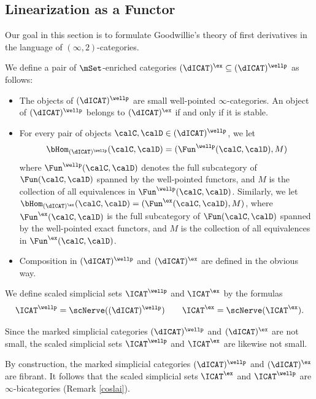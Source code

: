 \subsection{Linearization as a Functor}\label{finalx}\label{bisec5.3}

Our goal in this section is to formulate Goodwillie's theory of first derivatives in
the language of $(\infty,2)$-categories.

\begin{definition}
We define a pair of $\mSet$-enriched categories $(\dICAT)^{\ex} \subseteq
(\dICAT)^{\wellp}$ as follows:
\begin{itemize}
\item[$(1)$] The objects of $(\dICAT)^{\wellp}$ are small well-pointed $\infty$-categories.
An object of $(\dICAT)^{\wellp}$ belongs to $(\dICAT)^{\ex}$ if and only if it is stable.
\item[$(2)$] For every pair of objects $\calC, \calD \in (\dICAT)^{\wellp}$, we let
$$\bHom_{ (\dICAT)^{\wellp}}( \calC, \calD) = ( \Fun^{\wellp}(\calC, \calD), M)$$
where $\Fun^{\wellp}(\calC, \calD)$ denotes the full subcategory of
$\Fun(\calC, \calD)$ spanned by the well-pointed functors, and $M$ is the collection
of all equivalences in $\Fun^{\wellp}(\calC, \calD)$. Similarly, we let
$\bHom_{ (\dICAT)^{\ex}}(\calC, \calD) = ( \Fun^{\ex}(\calC, \calD), M)$, where
$\Fun^{\ex}(\calC, \calD)$ is the full subcategory of $\Fun(\calC,\calD)$ spanned
by the well-pointed exact functors, and $M$ is the collection of all equivalences
in $\Fun^{\ex}(\calC, \calD)$.
\item[$(3)$] Composition in $(\dICAT)^{\wellp}$ and $(\dICAT)^{\ex}$ are defined in the obvious way.
\end{itemize}
\end{definition}

\begin{definition}
We define scaled simplicial sets $\ICAT^{\wellp}$ and $\ICAT^{\ex}$ by the formulas
$$ \ICAT^{\wellp} = \scNerve( (\dICAT)^{\wellp}) \quad \quad \ICAT^{\ex} = \scNerve( \ICAT^{\ex} ).$$
\end{definition}

\begin{remark}
Since the marked simplicial categories $(\dICAT)^{\wellp}$ and $(\dICAT)^{\ex}$ are not small,
the scaled simplicial sets $\ICAT^{\wellp}$ and $\ICAT^{\ex}$ are likewise not small.
\end{remark}

\begin{remark}
By construction, the marked simplicial categories $(\dICAT)^{\wellp}$ and
$(\dICAT)^{\ex}$ are fibrant. It follows that the scaled simplicial sets
$\ICAT^{\ex}$ and $\ICAT^{\wellp}$ are $\infty$-bicategories (Remark \ref{coslai}).
\end{remark}

